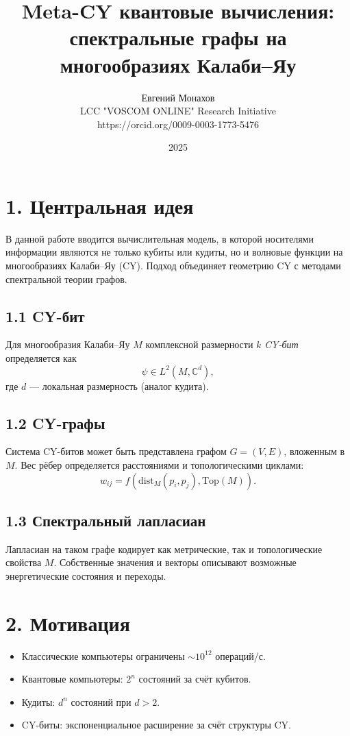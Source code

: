 \documentclass[12pt,a4paper]{article}
\title{Meta-CY квантовые вычисления: спектральные графы на многообразиях Калаби--Яу}
\author{Евгений Монахов \\ LCC "VOSCOM ONLINE" Research Initiative \\ https://orcid.org/0009-0003-1773-5476}
\date{2025}
\begin{document}
\maketitle

\section*{1. Центральная идея}
В данной работе вводится вычислительная модель, в которой 
носителями информации являются не только кубиты или кудиты, 
но и волновые функции на многообразиях Калаби--Яу (CY).  
Подход объединяет геометрию CY с методами спектральной теории графов.  

\subsection*{1.1 CY-бит}
Для многообразия Калаби--Яу $M$ комплексной размерности $k$ 
\emph{CY-бит} определяется как
\begin{equation}
\psi \in L^2(M, \mathbb{C}^d),
\end{equation}
где $d$ — локальная размерность (аналог кудита).  

\subsection*{1.2 CY-графы}
Система CY-битов может быть представлена графом $G=(V,E)$, 
вложенным в $M$.  
Вес рёбер определяется расстояниями и топологическими циклами:
\begin{equation}
w_{ij} = f(\mathrm{dist}_M(p_i,p_j), \mathrm{Top}(M)).
\end{equation}

\subsection*{1.3 Спектральный лапласиан}
Лапласиан на таком графе кодирует 
как метрические, так и топологические свойства $M$.  
Собственные значения и векторы описывают 
возможные энергетические состояния и переходы.  

\section*{2. Мотивация}
\begin{itemize}
  \item Классические компьютеры ограничены $\sim 10^{12}$ операций/с.
  \item Квантовые компьютеры: $2^n$ состояний за счёт кубитов.
  \item Кудиты: $d^n$ состояний при $d>2$.
  \item CY-биты: экспоненциальное расширение за счёт структуры CY.
\end{itemize}
\end{document}
